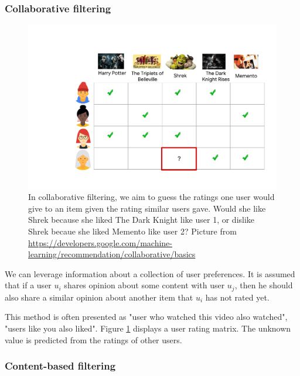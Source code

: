 \subsubsection{Collaborative filtering}

\begin{figure}
    \centering
    \includegraphics[scale=0.5]{70-files/collaborative-filtering.pdf}
    \caption{In collaborative filtering, we aim to guess the ratings one user would give to an item given the rating similar users gave. Would she like Shrek because she liked The Dark Knight like user 1, or dislike Shrek becaue she liked Memento like user 2? Picture from \url{https://developers.google.com/machine-learning/recommendation/collaborative/basics}}
    \label{fig:collab-filtering}
\end{figure}

We can leverage information about a collection of user preferences. It is assumed that if a user $u_i$ shares opinion about some content with user $u_j$, then he should also share a similar opinion about another item that $u_i$ has not rated yet.

This method is often presented as "user who watched this video also watched", "users like you also liked". Figure \ref{fig:collab-filtering} displays a user rating matrix. The unknown value is predicted from the ratings of other users.

\subsubsection{Content-based filtering}

